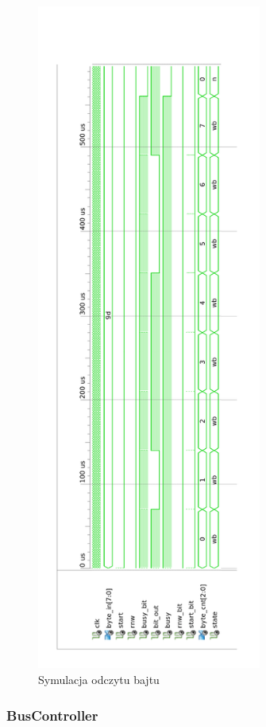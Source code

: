 \documentclass[a4paper]{article}
\begin{document}
\begin{figure}[H]
\begin{center}
\includegraphics[height=22cm]{graphics/byte_module_symulation3.png}
\end{center}
\caption{Symulacja odczytu bajtu}
\label{byte_module_symulation2}
\end{figure}

\newpage

\subsubsection{BusController}
\end{document}
